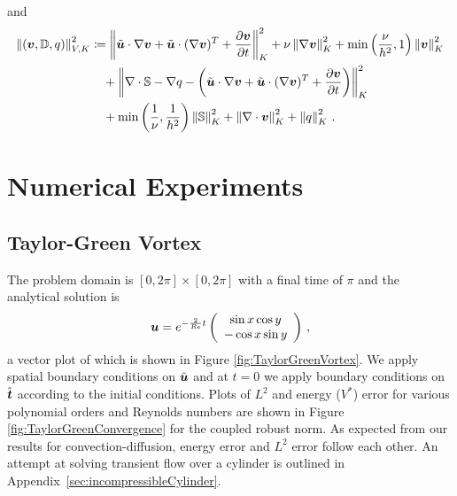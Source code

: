 \documentclass[Dissertation.tex]{subbIles}
\begin{document}
and
\begin{align*}
\left\| \left( \boldsymbol v,\mathbb{D},q \right) \right\|_{V,K}^2 &\coloneqq
\left\| \tilde{\boldsymbol u}\cdot\nabla\boldsymbol v +\tilde{\boldsymbol u}\cdot(\nabla\boldsymbol v)^T+\frac{\partial\boldsymbol v}{\partial t} \right\|_K^2
+ \nu\left\| \nabla\boldsymbol v \right\|_K^2
+ \min\left( \frac{\nu}{h^2},1 \right)\left\| \boldsymbol v \right\|^2_K
\\\nonumber&\quad
+ \left\| \nabla\cdot\mathbb{S}-\nabla q-\left( \tilde{\boldsymbol u}\cdot\nabla\boldsymbol v +\tilde{\boldsymbol u}\cdot(\nabla\boldsymbol v)^T+\frac{\partial\boldsymbol v}{\partial t} \right) \right\|_K^2
\\\nonumber&\quad
+ \min\left( \frac{1}{\nu},\frac{1}{h^2} \right)\left\| \mathbb{S} \right\|_K^2
+\left\| \nabla\cdot\boldsymbol v \right\|_K^2
+\left\| q \right\|_K^2
\,.
\end{align*}

\section{Numerical Experiments}
\subsection{Taylor-Green Vortex}
The problem domain is $[0,2\pi]\times[0,2\pi]$ with a final time of $\pi$ and the analytical solution is 
\[
\boldsymbol u=e^{-\frac{2}{Re}t}\left( \begin{array}{c} \sin{x}\cos{y}\\ -\cos{x}\sin{y}\\ \end{array} \right)\,,
\]
a vector plot of which is shown in Figure \ref{fig:TaylorGreenVortex}.
We apply spatial boundary conditions on $\hat{\boldsymbol u}$ and at $t=0$ we apply boundary conditions
on $\hat{\boldsymbol t}$ according to the initial conditions.
Plots of $L^2$ and energy ($V^*$) error for various polynomial orders and Reynolds numbers are shown
in Figure \ref{fig:TaylorGreenConvergence} for the coupled robust norm.
As expected from our results for convection-diffusion, energy error and $L^2$ error follow each other.
An attempt at solving transient flow over a cylinder is outlined in Appendix~\ref{sec:incompressibleCylinder}.
\end{document}
